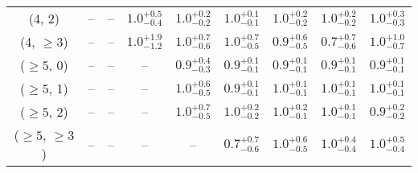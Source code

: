 \begin{table}[h!]
{\begin{tabular}{ccccccccc}
	(4, 2) & -- & -- & $1.0^{+ 0.5 }_{- 0.4 }$ & $1.0^{+ 0.2 }_{- 0.2 }$ & $1.0^{+ 0.1 }_{- 0.1 }$ & $1.0^{+ 0.2 }_{- 0.2 }$ & $1.0^{+ 0.2 }_{- 0.2 }$ & $1.0^{+ 0.3 }_{- 0.3 }$ \\[0.5ex] 
	(4, $\ge3$) & -- & -- & $1.0^{+ 1.9 }_{- 1.2 }$ & $1.0^{+ 0.7 }_{- 0.6 }$ & $1.0^{+ 0.7 }_{- 0.5 }$ & $0.9^{+ 0.6 }_{- 0.5 }$ & $0.7^{+ 0.7 }_{- 0.6 }$ & $1.0^{+ 1.0 }_{- 0.7 }$ \\[0.5ex] 
	($\ge5$, 0) & -- & -- & -- & $0.9^{+ 0.4 }_{- 0.3 }$ & $0.9^{+ 0.1 }_{- 0.1 }$ & $0.9^{+ 0.1 }_{- 0.1 }$ & $0.9^{+ 0.1 }_{- 0.1 }$ & $0.9^{+ 0.1 }_{- 0.1 }$ \\[0.5ex] 
	($\ge5$, 1) & -- & -- & -- & $1.0^{+ 0.6 }_{- 0.5 }$ & $0.9^{+ 0.1 }_{- 0.1 }$ & $1.0^{+ 0.1 }_{- 0.1 }$ & $1.0^{+ 0.1 }_{- 0.1 }$ & $1.0^{+ 0.1 }_{- 0.1 }$ \\[0.5ex] 
	($\ge5$, 2) & -- & -- & -- & $1.0^{+ 0.7 }_{- 0.5 }$ & $1.0^{+ 0.2 }_{- 0.2 }$ & $1.0^{+ 0.2 }_{- 0.1 }$ & $1.0^{+ 0.1 }_{- 0.1 }$ & $0.9^{+ 0.2 }_{- 0.2 }$ \\[0.5ex] 
	($\ge5$, $\ge3$) & -- & -- & -- & -- & $0.7^{+ 0.7 }_{- 0.6 }$ & $1.0^{+ 0.6 }_{- 0.5 }$ & $1.0^{+ 0.4 }_{- 0.4 }$ & $1.0^{+ 0.5 }_{- 0.4 }$ \\[0.5ex] 
	\hline
	\hline
\end{tabular}}
\end{table}
